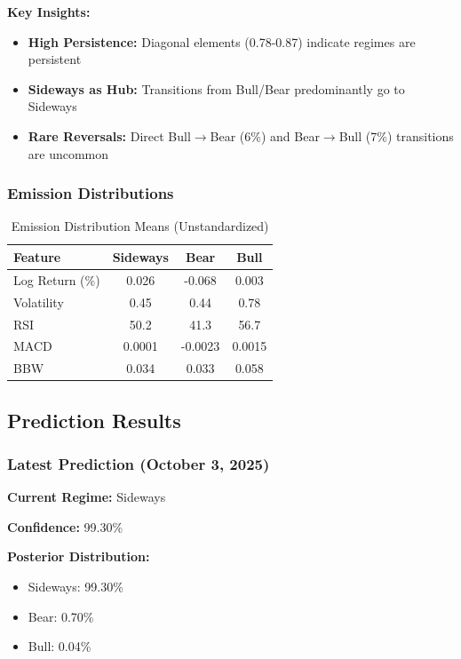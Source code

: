 \documentclass[conference]{IEEEtran}
\begin{document}
\textbf{Key Insights:}
\begin{itemize}
\item \textbf{High Persistence:} Diagonal elements (0.78-0.87) indicate regimes are persistent
\item \textbf{Sideways as Hub:} Transitions from Bull/Bear predominantly go to Sideways
\item \textbf{Rare Reversals:} Direct Bull$\rightarrow$Bear (6\%) and Bear$\rightarrow$Bull (7\%) transitions are uncommon
\end{itemize}

\subsubsection{Emission Distributions}
\begin{table}[htbp]
\centering
\caption{Emission Distribution Means (Unstandardized)}
\label{tab:emissions}
\begin{tabular}{lccc}
\toprule
\textbf{Feature} & \textbf{Sideways} & \textbf{Bear} & \textbf{Bull} \\
\midrule
Log Return (\%) & 0.026 & -0.068 & 0.003 \\
Volatility & 0.45 & 0.44 & 0.78 \\
RSI & 50.2 & 41.3 & 56.7 \\
MACD & 0.0001 & -0.0023 & 0.0015 \\
BBW & 0.034 & 0.033 & 0.058 \\
\bottomrule
\end{tabular}
\end{table}

\subsection{Prediction Results}

\subsubsection{Latest Prediction (October 3, 2025)}
\textbf{Current Regime:} Sideways

\textbf{Confidence:} 99.30\%

\textbf{Posterior Distribution:}
\begin{itemize}
\item Sideways: 99.30\%
\item Bear: 0.70\%
\item Bull: 0.04\%
\end{itemize}
\end{document}
